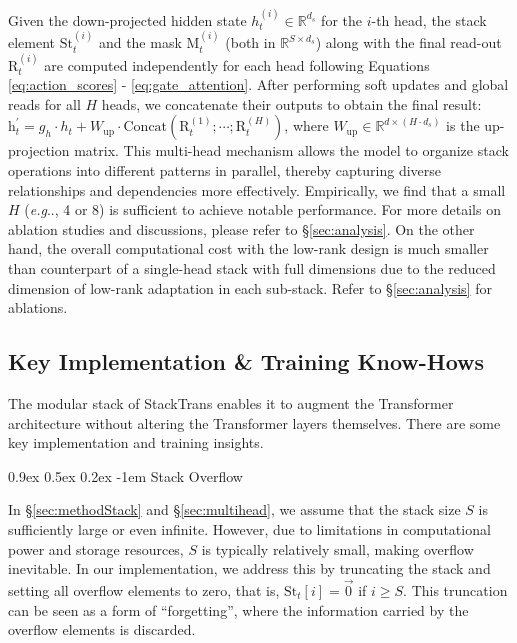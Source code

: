 \documentclass{article}
\makeatletter
\providecommand{\paragraph}{}
\renewcommand{\paragraph}[1]{%
  \@startsection{paragraph}{4}{\z@}%
                {0.9ex \@plus 0.5ex \@minus 0.2ex}%
                {-1em}%
                {\normalsize\bfseries}%
  {#1}
}
\DeclareRobustCommand\onedot{\futurelet\@let@token\@onedot}
\def\@onedot{\ifx\@let@token.\else.\null\fi\xspace}
\def\eg{\emph{e.g}\onedot} \def\Eg{\emph{E.g}\onedot}
\DeclareRobustCommand{\method}{{\sc StackTrans}\xspace}
\makeatother
\begin{document}
Given the down-projected hidden state $h_t^{(i)}\in\mathbb{R}^{d_s}$ for the $i$-th head, the stack element $\text{St}_t^{(i)}$ and the mask $\text{M}_t^{(i)}$ (both in $\mathbb{R}^{S\times d_s}$) along with the final read-out $\text{R}_t^{(i)}$ are computed independently for each head following Equations \ref{eq:action_scores} - \ref{eq:gate_attention}.
After performing soft updates and global reads for all $H$ heads, we concatenate their outputs to obtain the final result:
$\text{h}^{'}_t= g_{h} \cdot h_t + W_{\mathrm{up}} \cdot \mathrm{Concat}\left( \text{R}^{(1)}_t;\cdots;\text{R}^{(H)}_t \right)$,
where $W_\text{up}\in\mathbb{R}^{d\times(H\cdot d_s)}$ is the up-projection matrix.
This multi-head mechanism allows the model to organize stack operations into different patterns in parallel, thereby capturing diverse relationships and dependencies more effectively.
Empirically, we find that a small $H$ (\eg, 4 or 8) is sufficient to achieve notable performance.
For more details on ablation studies and discussions, please refer to \S\ref{sec:analysis}.
On the other hand, the overall computational cost with the low-rank design is much smaller than counterpart of a single-head stack with full dimensions due to the reduced dimension of low-rank adaptation in each sub-stack. Refer to \S\ref{sec:analysis} for ablations.


\subsection{Key Implementation \& Training Know-Hows}
\label{sec:trainingStack}

The modular stack of \method enables it to augment the Transformer architecture without altering the Transformer layers themselves.
There are some key implementation and training insights.

\paragraph{Stack Overflow}
In \S\ref{sec:methodStack} and \S\ref{sec:multihead}, we assume that the stack size $S$ is sufficiently large or even infinite.
However, due to limitations in computational power and storage resources, $S$ is typically relatively small, making overflow inevitable.
In our implementation, we address this by truncating the stack and setting all overflow elements to zero, that is, $\text{St}_t[i]=\vec0$ if $i\ge S$.
This truncation can be seen as a form of ``forgetting'', where the information carried by the overflow elements is discarded.
\end{document}
